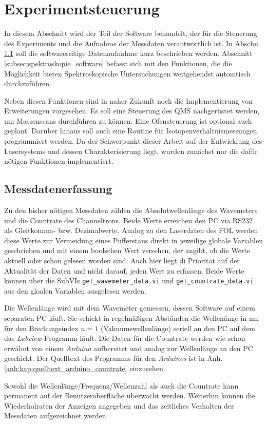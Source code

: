 \section{Experimentsteuerung}\label{sec:experimentsteuerung}
In diesem Abschnitt wird der Teil der Software behandelt, der für die Steuerung
des Experiments und die Aufnahme der Messdaten verantwortlich ist. In Abschn.
\ref{subsec:messdatenerfassung} soll die softwareseitige Datenaufnahme kurz
beschrieben werden. Abschnitt \ref{subsec:spektroskopie_software} befasst sich mit den
Funktionen, die die Möglichkeit bieten Spektroskopische Untersuchungen
weitgehendst automtisch durchzuführen.\par
Neben diesen Funktionen sind in naher Zukunft noch die Implementierung von
Erweiterungen vorgesehen. Es soll eine Steuerung des QMS nachgerüstet werden, um
Massenscans durchführen zu können. Eine Ofensteuerung ist optional auch geplant.
Darüber hinaus soll auch eine Routine für Isotopenverhältnismessungen
programmiert werden. Da der Schwerpunkt dieser Arbeit auf der Entwicklung des
Lasersystems und dessen Charakterisierung liegt, wurden zunächst nur die dafür
nötigen Funktionen implementiert.

\subsection{Messdatenerfassung}\label{subsec:messdatenerfassung}
Zu den bisher nötigen Messdaten zählen die Absolutwellenlänge des Wavemeters und
die Countrate des Channeltrons. Beide Werte erreichen den PC via RS232 als
Gleitkomma- bzw. Dezimalwerte. Analog zu den Laserdaten des FOL werden diese
Werte zur Vermeidung eines Pufferstaus direkt in jeweilige globale Variablen
geschrieben und mit einem boolschen Wert versehen, der angibt, ob die Werte
aktuell oder schon gelesen worden sind. Auch hier liegt di  Priorität auf der
Aktualität der Daten und nicht darauf, jeden Wert zu erfassen. Beide Werte
können über die SubVIs \lstinline|get_wavemeter_data.vi| und
\lstinline|get_countrate_data.vi| aus den gloalen Variablen ausgelesen
werden.\par
Die Wellenlänge wird mit dem Wavemeter gemessen, dessen Software auf einem
separaten PC läuft. Sie schickt in regelmäßigen Abständen die Wellenänge in nm
für den Brechungsindex $n=1$ (Vakuumswellenlänge) seriell an den PC auf dem das
\textit{Labview}-Programm läuft. Die Daten für die Countrate werden wie schon
erwähnt von einem \textit{Arduino} aufbereitet und analog zur Wellenlänge an den
PC geschickt. Der Quelltext des Programms für den \textit{Arduinos} ist in Anh.
\ref{anh:kap:quelltext_arduino_countrate} einzusehen.\par
Sowohl die Wellenlänge/Frequenz/Wellenzahl als auch die Countrate kann
permanent auf der Benutzeroberfläche überwacht werden. Weiterhin können die
Wiederholraten der Anzeigen angegeben und das zeitliches Verhalten der Messdaten
aufgezeichnet werden.

